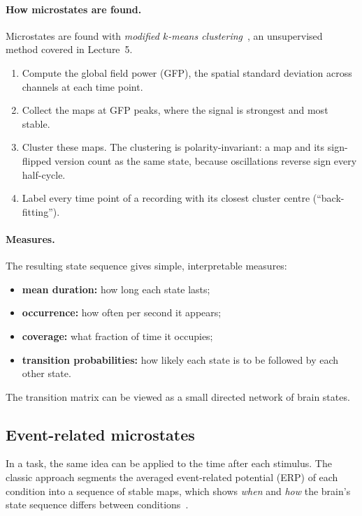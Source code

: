 \documentclass[11pt,a4paper]{article}
\begin{document}
\paragraph{How microstates are found.} Microstates are found with \emph{modified $k$-means clustering}~\cite{pascualmarqui1995}, an unsupervised method covered in Lecture~5.
\begin{enumerate}
  \item Compute the global field power (GFP), the spatial standard deviation across channels at each time point.
  \item Collect the maps at GFP peaks, where the signal is strongest and most stable.
  \item Cluster these maps. The clustering is polarity-invariant: a map and its sign-flipped version count as the same state, because oscillations reverse sign every half-cycle.
  \item Label every time point of a recording with its closest cluster centre (``back-fitting'').
\end{enumerate}

\paragraph{Measures.} The resulting state sequence gives simple, interpretable measures:
\begin{itemize}
  \item \textbf{mean duration:} how long each state lasts;
  \item \textbf{occurrence:} how often per second it appears;
  \item \textbf{coverage:} what fraction of time it occupies;
  \item \textbf{transition probabilities:} how likely each state is to be followed by each other state.
\end{itemize}
The transition matrix can be viewed as a small directed network of brain states.

\subsection{Event-related microstates}

In a task, the same idea can be applied to the time after each stimulus. The classic approach segments the averaged event-related potential (ERP) of each condition into a sequence of stable maps, which shows \emph{when} and \emph{how} the brain's state sequence differs between conditions~\cite{murray2008}.
\end{document}
